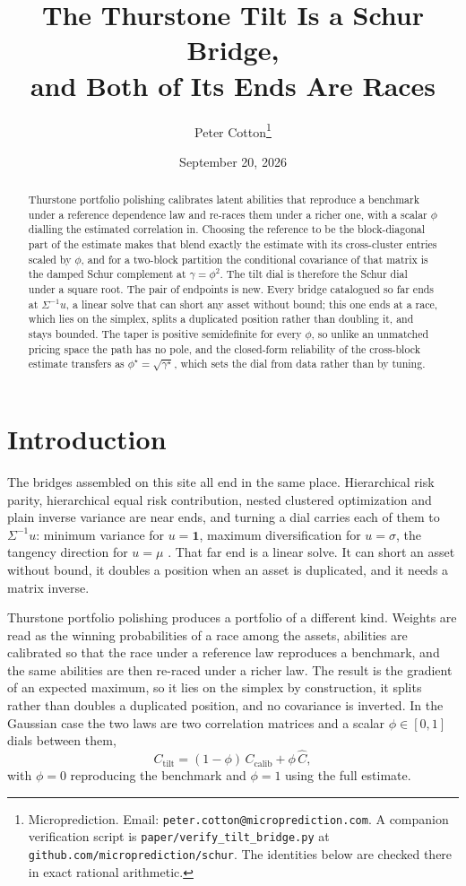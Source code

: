 \documentclass[11pt]{article}
\title{The Thurstone Tilt Is a Schur Bridge,\\
and Both of Its Ends Are Races}
\author{Peter Cotton\thanks{Microprediction.
Email: \texttt{peter.cotton@microprediction.com}. A companion verification
script is \texttt{paper/verify\_tilt\_bridge.py} at
\texttt{github.com/microprediction/schur}. The identities below are checked
there in exact rational arithmetic.}}
\date{September 20, 2026}
\newcommand{\ones}{\mathbf{1}}
\begin{document}
\maketitle

\begin{abstract}
Thurstone portfolio polishing calibrates latent abilities that reproduce a
benchmark under a reference dependence law and re-races them under a richer
one, with a scalar $\phi$ dialling the estimated correlation in. Choosing the
reference to be the block-diagonal part of the estimate makes that blend
exactly the estimate with its cross-cluster entries scaled by $\phi$, and for a
two-block partition the conditional covariance of that matrix is the damped
Schur complement at $\gamma=\phi^2$. The tilt dial is therefore the Schur dial
under a square root. The pair of endpoints is new. Every bridge
catalogued so far ends at $\Sigma^{-1}u$, a linear solve that can short any
asset without bound; this one ends at a race, which lies on the simplex, splits
a duplicated position rather than doubling it, and stays bounded. The taper is
positive semidefinite for every $\phi$, so unlike an unmatched pricing space the
path has no pole, and the closed-form reliability of the cross-block estimate
transfers as $\phi^\star=\sqrt{\gamma^\star}$, which sets the dial from data
rather than by tuning.
\end{abstract}

\section{Introduction}

The bridges assembled on this site all end in the same place. Hierarchical risk
parity, hierarchical equal risk contribution, nested clustered optimization and
plain inverse variance are near ends, and turning a dial carries each of them to
$\Sigma^{-1}u$: minimum variance for $u=\ones$, maximum diversification for
$u=\sigma$, the tangency direction for $u=\mu$ \cite{cotton2024schur,
cotton2026nco, cotton2026herc}. That far end is a linear solve. It can short an
asset without bound, it doubles a position when an asset is duplicated, and it
needs a matrix inverse.

Thurstone portfolio polishing \cite{cotton2026thurstone} produces a portfolio of
a different kind. Weights are read as the winning probabilities of a race among
the assets, abilities are calibrated so that the race under a reference law
reproduces a benchmark, and the same abilities are then re-raced under a richer
law. The result is the gradient of an expected maximum, so it lies on the
simplex by construction, it splits rather than doubles a duplicated position,
and no covariance is inverted. In the Gaussian case the two laws are two
correlation matrices and a scalar $\phi\in[0,1]$ dials between them,
\begin{equation}
  C_{\mathrm{tilt}}=(1-\phi)\,C_{\mathrm{calib}}+\phi\,\widehat C ,
  \label{eq:blend}
\end{equation}
with $\phi=0$ reproducing the benchmark and $\phi=1$ using the full estimate.
\end{document}
